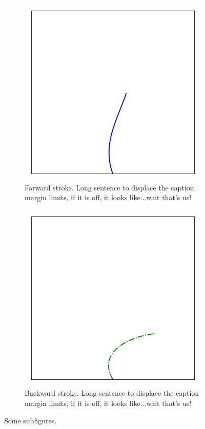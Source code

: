 \begin{figure}
\begin{subfigure}[h!]{0.32\textwidth}
        \includegraphics[width=\linewidth]{img/subfolder1/cilia_img1.png}
        \caption{Forward stroke. Long sentence to displace the caption margin limits, if it is off,  it looks like...wait that's us!}
        \label{fig:subfigure1}
    \end{subfigure}
    \begin{subfigure}[h!]{0.32\textwidth}%
        \includegraphics[width=\linewidth]{img/subfolder1/cilia_img2.png}
        \caption{Backward stroke. Long sentence to displace the caption margin limits, if it is off, it looks like...wait that's us!}
        \label{fig:subfigure2}
    \end{subfigure}
    \caption{Some subfigures.}
    \label{fig:subfigures}
\end{figure}

